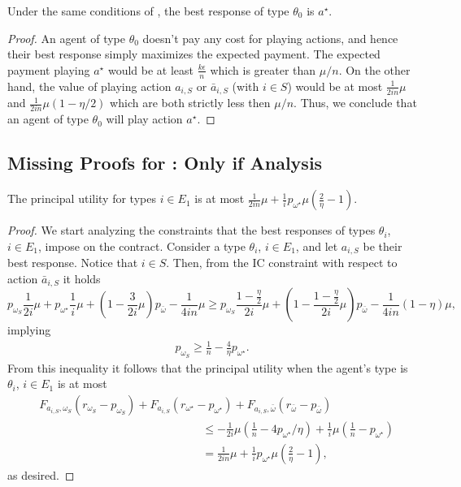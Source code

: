 \begin{lemma}\label{lem:BR_IF2}
    Under the same conditions of , the best response of type $\theta_0$ is $a^\star$.
\end{lemma}
\begin{proof}
    An agent of type $\theta_0$ doesn't pay any cost for playing actions, and hence their best response simply maximizes the expected payment. 
    The expected payment playing $a^\star$ would be at least $\frac{k\epsilon}{n}$ which is greater than $\mu/n$. On the other hand, the value of playing action $a_{i, S}$ or $\bar a_{i,S}$ (with $i\in S$) would be at most $\frac{1}{2in}\mu$ and $\frac{1}{2in}\mu(1-\eta/2)$ which are both strictly less then $\mu/n$. Thus, we conclude that an agent of type $\theta_0$ will play action $a^\star$.
\end{proof}


\subsection{Missing Proofs for : Only if Analysis}


\begin{lemma}\label{lem:onlyif1}
   The principal utility for types $i\in E_1$ is at most $\frac{1}{2in}\mu+\frac{1}{i}p_{\omega^\star}\mu\left(\frac{2}{\eta}-1\right)$.
\end{lemma}
\begin{proof}
    	We start analyzing the constraints that the best responses of types $\theta_i$, $i \in E_1$, impose on the contract.
	Consider a type $\theta_i$, $i \in E_1$, and let $a_{i,S}$ be their best response. Notice that $i \in S$.
	Then, from the IC constraint with respect to action $\bar a_{i,S}$ it holds
	\[
	p_{\omega_{S}}\frac{1}{2i}\mu + p_{\omega^\star}  \frac{1}{i}\mu+\left(1-\frac{3}{2i}\mu\right)p_{\bar\omega}- \frac{1}{4in}\mu \ge  p_{\omega_{S}}\frac{1-\frac{\eta}{2}}{2i} \mu +\left(1-\frac{1-\frac{\eta}{2}}{2i}\mu\right)p_{\bar\omega}- \frac{1}{4in} (1-\eta) \mu,
	\]
	implying
	\begin{align}\label{eq:largeE1}
	    p_{\omega_{S}}\ge \frac{1}{n}-\frac{4}{\eta}p_{\omega^\star}.
	\end{align}
%	
	From this inequality it follows that the principal utility when the agent's type is $\theta_i$, $i\in E_1$ is at most
	\begin{align*}
	&F_{a_{i,S},\omega_S}(r_{\omega_S}-p_{\omega_S})+F_{a_{i,S}}(r_{\omega^\star}-p_{\omega^\star})+F_{a_{i,S},\bar \omega}(r_{\bar \omega}-p_{\bar\omega})\nonumber\\
        &\hspace{6cm}\le-\frac{1}{2i}\mu(\frac{1}{n}-4p_{\omega^\star}/\eta)+\frac{1}{i}\mu(\frac{1}{n}-p_{\omega^\star})\nonumber\\
	&\hspace{6cm}=\frac{1}{2in}\mu+\frac{1}{i}p_{\omega^\star}\mu\left(\frac{2}{\eta}-1\right),\label{eq:boundE1}
	\end{align*}
    as desired.
\end{proof}

